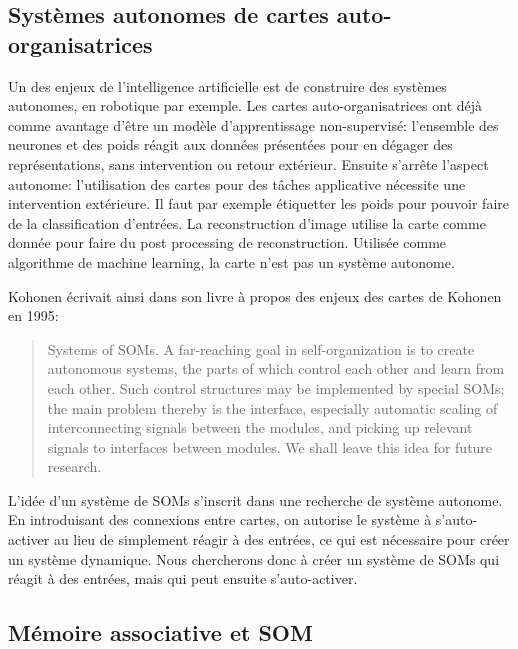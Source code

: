 
\subsection{Systèmes autonomes de cartes auto-organisatrices}

Un des enjeux de l'intelligence artificielle est de construire des systèmes autonomes, en robotique par exemple. Les cartes auto-organisatrices ont déjà comme avantage d'être un modèle d'apprentissage non-supervisé: l'ensemble des neurones et des poids réagit aux données présentées pour en dégager des représentations, sans intervention ou retour extérieur. Ensuite s'arrête l'aspect autonome: l'utilisation des cartes pour des tâches applicative nécessite une intervention extérieure. Il faut par exemple étiquetter les poids pour pouvoir faire de la classification d'entrées. La reconstruction d'image utilise la carte comme donnée pour faire du post processing de reconstruction. Utilisée comme algorithme de machine learning, la carte n'est pas un système autonome. 

Kohonen écrivait ainsi dans son livre à propos des enjeux des cartes de Kohonen en 1995:


\begin{quote}Systems of SOMs. A far-reaching goal in self-organization is to create
autonomous systems, the parts of which control each other and learn from
each other. Such control structures may be implemented by special SOMs;
the main problem thereby is the interface, especially automatic scaling of
interconnecting signals between the modules, and picking up relevant signals
to interfaces between modules. We shall leave this idea for future research. \cite{Kohonen1995SelfOrganizingM}
\end{quote}
L'idée d'un système de SOMs s'inscrit dans une recherche de système autonome. En introduisant des connexions entre cartes, on autorise le système à s'auto-activer au lieu de simplement réagir à des entrées, ce qui est nécessaire pour créer un système dynamique. Nous chercherons donc à créer un système de SOMs qui réagit à des entrées, mais qui peut ensuite s'auto-activer.

\subsection{Mémoire associative et SOM}

